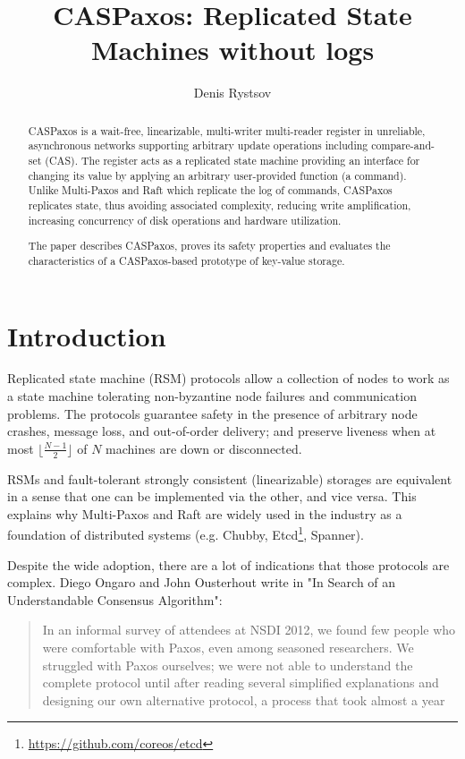 \documentclass[a4paper,USenglish]{lipics-v2018}
\title{CASPaxos: Replicated State Machines without logs}
\author{Denis Rystsov}{Microsoft}{derystso@microsoft.com}{}{}
\theoremstyle{definition}
\begin{document}
    
    \maketitle
    
    \begin{abstract}
        CASPaxos is a wait-free, linearizable, multi-writer multi-reader register in unreliable, asynchronous networks supporting arbitrary update operations including compare-and-set (CAS). The register acts as a replicated state machine providing an interface for changing its value by applying an arbitrary user-provided function (a command). Unlike Multi-Paxos and Raft which replicate the log of commands, CASPaxos replicates state, thus avoiding associated complexity, reducing write amplification, increasing concurrency of disk operations and hardware utilization.
    
        The paper describes CASPaxos, proves its safety properties and evaluates the characteristics of a CASPaxos-based prototype of key-value storage.
    \end{abstract}

\section{Introduction}

    Replicated state machine (RSM) protocols allow a collection of nodes to work as a state machine tolerating non-byzantine node failures and communication problems. The protocols guarantee safety in the presence of arbitrary node crashes, message loss, and out-of-order delivery; and preserve liveness when at most $\lfloor \frac{N-1}2 \rfloor$ of $N$ machines are down or disconnected.

    RSMs and fault-tolerant strongly consistent (linearizable) storages are equivalent in a sense that one can be implemented via the other, and vice versa. This explains why Multi-Paxos\cite{lamport01} and Raft\cite{raft} are widely used in the industry as a foundation of distributed systems (e.g. Chubby\cite{chubby}, Etcd\footnote{\href{https://github.com/coreos/etcd}{https://github.com/coreos/etcd}}, Spanner\cite{spanner}).

    Despite the wide adoption, there are a lot of indications that those protocols are complex. Diego Ongaro and John Ousterhout write in "In Search of an Understandable Consensus Algorithm"\cite{raft}:

    \begin{quote}
        In an informal survey of attendees at NSDI 2012, we found few people who were comfortable with Paxos, even among seasoned researchers. We struggled with Paxos ourselves; we were not able to understand the complete protocol until after reading several simplified explanations and designing our own alternative protocol, a process that took almost a year
    \end{quote}
\end{document}
